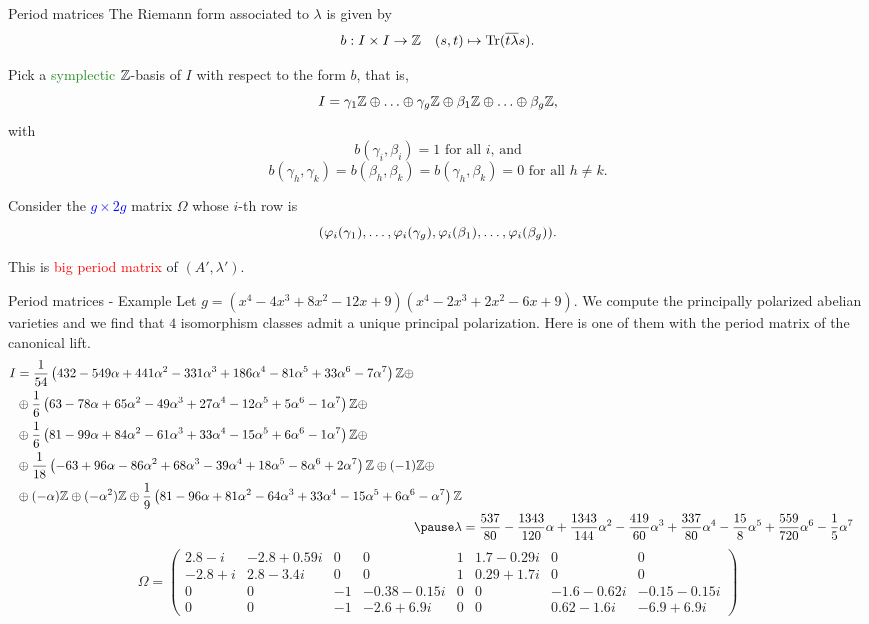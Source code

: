 \documentclass[usenames,dvipsnames]{beamer}
\newcommand{\red}[1]{\textcolor{red}{#1}}
\newcommand{\blue}[1]{\textcolor{blue}{#1}}
\newcommand{\green}[1]{\textcolor{ForestGreen}{#1}}
\begin{document}
\begin{frame}{ Period matrices }
   The Riemann form associated to $\lambda$ is given by
   \[ b:I\times I \to \mathbb{Z} \quad (s,t)\mapsto \operatorname{Tr}(\overline{t\lambda}s). \]
    
   \pause Pick a \green{symplectic} $\mathbb{Z}$-basis of $I$ with respect to the form $b$, that is,
    \[ I = \gamma_1 \mathbb{Z} \oplus \ldots \oplus \gamma_g \mathbb{Z} \oplus \beta_1 \mathbb{Z} \oplus \ldots \oplus \beta_g \mathbb{Z}, \]
    \pause with
    \[ b(\gamma_i,\beta_i)=1 \text{ for all $i$, and}\]
    \[b(\gamma_h,\gamma_k)=b(\beta_h,\beta_k)=b(\gamma_h,\beta_k)=0 \text{ for all $h\neq k$}. \]
    
    \pause Consider the \blue{$g\times 2g$} matrix $\Omega$ whose $i$-th row is 
    \[({\varphi}_i(\gamma_1),\ldots,{\varphi}_i(\gamma_g),{\varphi}_i(\beta_1),\ldots,{\varphi}_i(\beta_g)).\]
    
    \pause This is \red{big period matrix} of $(A',\lambda')$.
\end{frame}
    
    
\begin{frame}{ Period matrices - Example }
   Let $g=(x^4 - 4x^3 + 8x^2 - 12x + 9)(x^4 - 2x^3 + 2x^2 - 6x + 9)$.
   \pause We compute the principally polarized abelian varieties and we find that $4$ isomorphism classes admit a unique principal polarization.
   \pause Here is one of them with the period matrix of the canonical lift.
 {\scriptsize\begin{align*}
    \begin{split}
       I & =  \dfrac{1}{54}\left(432-549\alpha+441\alpha^2-331\alpha^3+186\alpha^4-81\alpha^5+33\alpha^6-7\alpha^7\right)\Z\oplus\\
	   & \oplus\dfrac{1}{6}\left(63-78\alpha+65\alpha^2-49\alpha^3+27\alpha^4-12\alpha^5+5\alpha^6-1\alpha^7\right)\Z\oplus\\
           & \oplus\dfrac{1}{6}\left(81-99\alpha+84\alpha^2-61\alpha^3+33\alpha^4-15\alpha^5+6\alpha^6-1\alpha^7\right)\Z\oplus\\
           & \oplus\dfrac{1}{18}\left(-63+96\alpha-86\alpha^2+68\alpha^3-39\alpha^4+18\alpha^5-8\alpha^6+2\alpha^7\right)\Z\oplus(-1)\Z\oplus\\
	   & \oplus(-\alpha)\Z\oplus(-\alpha^2)\Z\oplus\dfrac{1}{9}\left(81-96\alpha+81\alpha^2-64\alpha^3+33\alpha^4-15\alpha^5+6\alpha^6-\alpha^7\right)\Z
    \end{split}\\
    \pause \lambda & = \dfrac{537}{80} -\dfrac{1343}{120}\alpha +\dfrac{1343}{144}\alpha^2 -\dfrac{419}{60}\alpha^3 +\dfrac{337}{80}\alpha^4 -\dfrac{15}{8}\alpha^5 +\dfrac{559}{720}\alpha^6 -\dfrac{1}{5}\alpha^7
    \end{align*}
    \pause
    \[
    \Omega =
    \begin{pmatrix}
      2.8 - i & -2.8 + 0.59i & 0 & 0 & 1 & 1.7 - 0.29i & 0 & 0 \\
      -2.8 + i & 2.8 - 3.4i & 0 & 0 & 1 & 0.29 + 1.7i & 0 & 0 \\
      0 & 0 & -1 & -0.38 - 0.15i & 0 & 0 & -1.6 - 0.62i & -0.15 - 0.15i\\
      0 & 0 & -1 & -2.6 + 6.9i & 0 & 0 & 0.62 - 1.6i & -6.9 + 6.9i
    \end{pmatrix}
    \]}
\end{frame}
\end{document}
